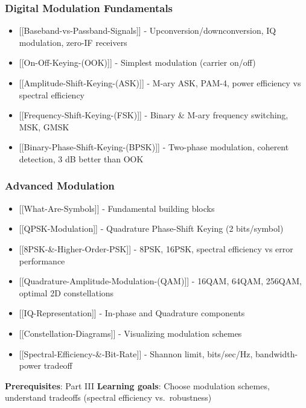 \subsubsection{Digital Modulation
Fundamentals}\label{digital-modulation-fundamentals}

\begin{itemize}
\tightlist
\item
  {[}{[}Baseband-vs-Passband-Signals{]}{]} -
  Upconversion/downconversion, IQ modulation, zero-IF receivers
\item
  {[}{[}On-Off-Keying-(OOK){]}{]} - Simplest modulation (carrier on/off)
\item
  {[}{[}Amplitude-Shift-Keying-(ASK){]}{]} - M-ary ASK, PAM-4, power
  efficiency vs spectral efficiency
\item
  {[}{[}Frequency-Shift-Keying-(FSK){]}{]} - Binary \& M-ary frequency
  switching, MSK, GMSK
\item
  {[}{[}Binary-Phase-Shift-Keying-(BPSK){]}{]} - Two-phase modulation,
  coherent detection, 3 dB better than OOK
\end{itemize}

\subsubsection{Advanced Modulation}\label{advanced-modulation}

\begin{itemize}
\tightlist
\item
  {[}{[}What-Are-Symbols{]}{]} - Fundamental building blocks
\item
  {[}{[}QPSK-Modulation{]}{]} - Quadrature Phase-Shift Keying (2
  bits/symbol)
\item
  {[}{[}8PSK-\&-Higher-Order-PSK{]}{]} - 8PSK, 16PSK, spectral
  efficiency vs error performance
\item
  {[}{[}Quadrature-Amplitude-Modulation-(QAM){]}{]} - 16QAM, 64QAM,
  256QAM, optimal 2D constellations
\item
  {[}{[}IQ-Representation{]}{]} - In-phase and Quadrature components
\item
  {[}{[}Constellation-Diagrams{]}{]} - Visualizing modulation schemes
\item
  {[}{[}Spectral-Efficiency-\&-Bit-Rate{]}{]} - Shannon limit,
  bits/sec/Hz, bandwidth-power tradeoff
\end{itemize}

\textbf{Prerequisites}: Part III \textbf{Learning goals}: Choose
modulation schemes, understand tradeoffs (spectral efficiency
vs.~robustness)

